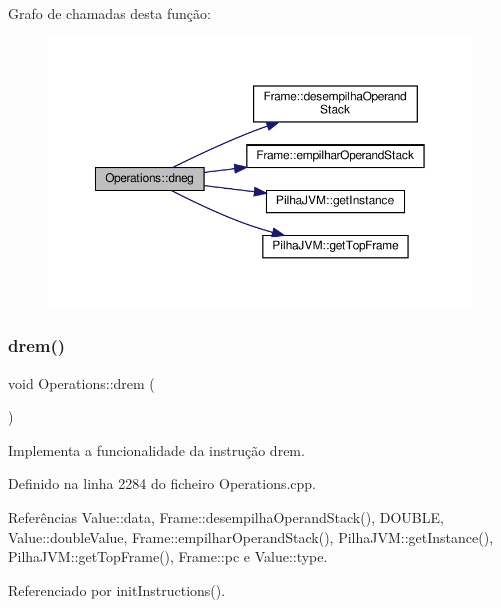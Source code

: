 Grafo de chamadas desta função\+:\nopagebreak
\begin{figure}[H]
\begin{center}
\leavevmode
\includegraphics[width=350pt]{classOperations_a04f5d4f85b80f4c04216cd0259d3d7dc_cgraph}
\end{center}
\end{figure}
\mbox{\label{classOperations_abe333415749dbd2331ce89dc5e2233c5}} 
\subsubsection{\texorpdfstring{drem()}{drem()}}
{\footnotesize\ttfamily void Operations\+::drem (\begin{DoxyParamCaption}{ }\end{DoxyParamCaption})\hspace{0.3cm}{\ttfamily [private]}}



Implementa a funcionalidade da instrução drem. 



Definido na linha 2284 do ficheiro Operations.\+cpp.



Referências Value\+::data, Frame\+::desempilha\+Operand\+Stack(), D\+O\+U\+B\+LE, Value\+::double\+Value, Frame\+::empilhar\+Operand\+Stack(), Pilha\+J\+V\+M\+::get\+Instance(), Pilha\+J\+V\+M\+::get\+Top\+Frame(), Frame\+::pc e Value\+::type.



Referenciado por init\+Instructions().

